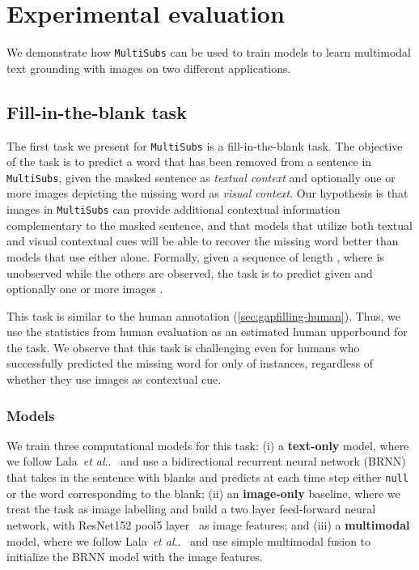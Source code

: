 \documentclass[twocolumn]{svjour3}          \smartqed  \usepackage{graphicx}
\makeatletter
\newcommand{\multisubs}{\texttt{MultiSubs}\xspace}
\DeclareRobustCommand\onedot{\futurelet\@let@token\@onedot}
\def\@onedot{\ifx\@let@token.\else.\null\fi\xspace}
\newcommand{\etal}{\emph{et al}\onedot}
\makeatother
\begin{document}
\section{Experimental evaluation}
\label{sec:experiments}

We demonstrate how \multisubs can be used to train models to learn multimodal text grounding with images on two different applications. 

\subsection{Fill-in-the-blank task}
\label{sec:gapfilling}

The first task we present for \multisubs is a fill-in-the-blank task. 
The objective of the task is to predict a word that has been removed from a sentence in \multisubs, given the masked sentence as \emph{textual context} and optionally one or more images depicting the missing word as \emph{visual context}. Our hypothesis is that images in \multisubs can provide additional contextual information complementary to the masked sentence, and that models that utilize both textual and visual contextual cues will be able to recover the missing word better than models that use either alone. Formally, given a sequence  of length , where  is unobserved while the others are observed, the task is to predict  given  and optionally one or more images . 

This task is similar to the human annotation (\ref{sec:gapfilling-human}). Thus, we use the statistics from human evaluation as an estimated human upperbound for the task. We observe that this task is challenging even for humans who successfully predicted the missing word for only  of instances, regardless of whether they use images as contextual cue.

\subsubsection{Models}
\label{sec:gapfilling-models}

We train three computational models for this task: (i) a \textbf{text-only} model, where we follow Lala~\etal~\cite{LalaEtAl:2019} and use a bidirectional recurrent neural network (BRNN) that takes in the sentence with blanks and predicts at each time step either \texttt{null} or the word corresponding to the blank;  (ii) an \textbf{image-only} baseline, where we treat the task as image labelling and build a two layer feed-forward neural network, with ResNet152 pool5 layer~\cite{HeEtAl:2016} as image features; and 
(iii) a \textbf{multimodal} model, where we follow Lala~\etal~\cite{LalaEtAl:2019} and use simple multimodal fusion to initialize the BRNN model with the image features.   
\end{document}
